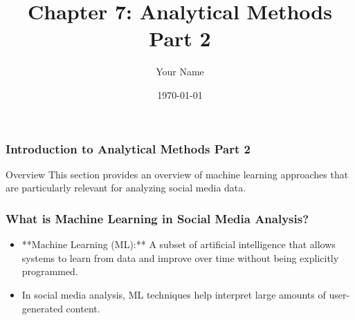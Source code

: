 \documentclass{beamer}
\title{Chapter 7: Analytical Methods Part 2}
\author{Your Name}
\institute{Your Institution}
\date{\today}
\begin{document}
\frame{\titlepage}

\begin{frame}[fragile]
    \frametitle{Introduction to Analytical Methods Part 2}
    \begin{block}{Overview}
        This section provides an overview of machine learning approaches that are particularly relevant for analyzing social media data.
    \end{block}
\end{frame}

\begin{frame}[fragile]
    \frametitle{What is Machine Learning in Social Media Analysis?}
    \begin{itemize}
        \item **Machine Learning (ML):** A subset of artificial intelligence that allows systems to learn from data and improve over time without being explicitly programmed.
        \item In social media analysis, ML techniques help interpret large amounts of user-generated content.
    \end{itemize}
\end{frame}
\end{document}
